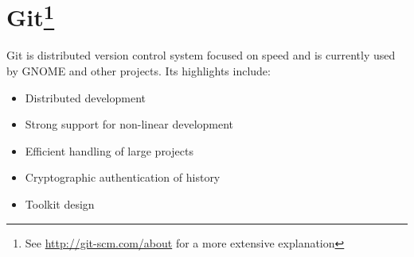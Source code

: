 
\section[Git]{Git\footnote{See \url{http://git-scm.com/about} for a more extensive explanation}}\label{sec:Git}

Git is distributed version control system focused on speed and is currently used by GNOME and other projects. Its highlights include:

\begin{itemize}
  \item Distributed development
  \item Strong support for non-linear development
  \item Efficient handling of large projects
  \item Cryptographic authentication of history
  \item Toolkit design
\end{itemize}
